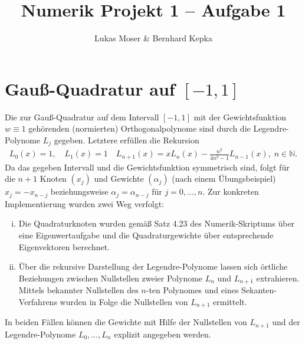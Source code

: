 \documentclass[french, 12pt, a4paper, onesided]{scrartcl}
\title{\textrm{\textbf{\large Numerik Projekt 1 -- Aufgabe 1}}}
\author{\normalsize Lukas Moser \& Bernhard Kepka}
\date{}
\theoremstyle{plain}
\theoremstyle{definition}
\theoremstyle{remark}
\newcommand{\N}{\mathbb{N}}
\begin{document}
\begin{minipage}[t]{\textwidth}
	\vspace*{-6.7\baselineskip}
	\maketitle
\end{minipage}
\vspace{-1.0cm}

\section{Gauß-Quadratur auf $ [-1,1] $}
Die zur Gauß-Quadratur auf dem Intervall $ [-1,1] $ mit der Gewichtsfunktion $ w\equiv1 $ gehörenden (normierten) Orthogonalpolynome sind durch die Legendre-Polynome $ L_j $ gegeben. Letztere erfüllen die Rekursion
\begin{align}\label{eq:Lrek}
	L_0(x)=1, \quad L_1(x)=1 \quad L_{n+1}(x)=xL_n(x)-\frac{n^2}{4n^2-1}L_{n-1}(x), \; n\in\N.
\end{align}
Da das gegeben Intervall und die Gewichtsfunktion symmetrisch sind, folgt für die $ n+1 $ Knoten $ (x_j) $ und Gewichte $ (\alpha_j) $ (nach einem Übungsbeispiel) $ x_j=-x_{n-j} $ beziehungsweise $ \alpha_j=\alpha_{n-j} $ für $ j=0,\ldots, n $.
\newline
Zur konkreten Implementierung wurden zwei Weg verfolgt:
\begin{enumerate}[(i)]
	\item Die Quadraturknoten wurden gemäß Satz 4.23 des Numerik-Skriptums über eine Eigenwertaufgabe und die Quadraturgewichte über entsprechende Eigenvektoren berechnet.
	\item Über die rekursive Darstellung der Legendre-Polynome lassen sich örtliche Beziehungen zwischen Nullstellen zweier Polynome $ L_n $ und $ L_{n+1} $ extrahieren. Mittels bekannter Nullstellen des $ n $-ten Polynomes und eines Sekanten-Verfahrens wurden in Folge die Nullstellen von $ L_{n+1} $ ermittelt.
\end{enumerate}
In beiden Fällen können die Gewichte mit Hilfe der Nullstellen von $ L_{n+1} $ und der Legendre-Polynome $ L_0,\ldots,L_n $ explizit angegeben werden.
\end{document}
